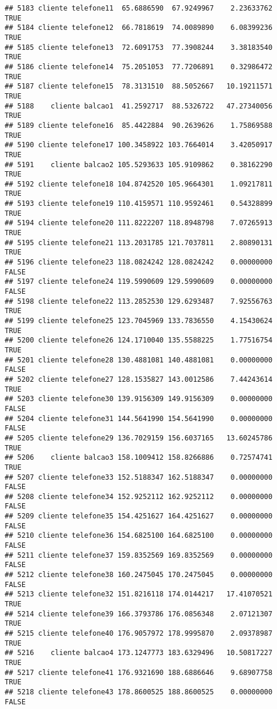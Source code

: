 \documentclass[
]{article}
\begin{document}
\begin{verbatim}
## 5183 cliente telefone11  65.6886590  67.9249967    2.23633762     TRUE
## 5184 cliente telefone12  66.7818619  74.0089890    6.08399236     TRUE
## 5185 cliente telefone13  72.6091753  77.3908244    3.38183540     TRUE
## 5186 cliente telefone14  75.2051053  77.7206891    0.32986472     TRUE
## 5187 cliente telefone15  78.3131510  88.5052667   10.19211571     TRUE
## 5188    cliente balcao1  41.2592717  88.5326722   47.27340056     TRUE
## 5189 cliente telefone16  85.4422884  90.2639626    1.75869588     TRUE
## 5190 cliente telefone17 100.3458922 103.7664014    3.42050917     TRUE
## 5191    cliente balcao2 105.5293633 105.9109862    0.38162290     TRUE
## 5192 cliente telefone18 104.8742520 105.9664301    1.09217811     TRUE
## 5193 cliente telefone19 110.4159571 110.9592461    0.54328899     TRUE
## 5194 cliente telefone20 111.8222207 118.8948798    7.07265913     TRUE
## 5195 cliente telefone21 113.2031785 121.7037811    2.80890131     TRUE
## 5196 cliente telefone23 118.0824242 128.0824242    0.00000000    FALSE
## 5197 cliente telefone24 119.5990609 129.5990609    0.00000000    FALSE
## 5198 cliente telefone22 113.2852530 129.6293487    7.92556763     TRUE
## 5199 cliente telefone25 123.7045969 133.7836550    4.15430624     TRUE
## 5200 cliente telefone26 124.1710040 135.5588225    1.77516754     TRUE
## 5201 cliente telefone28 130.4881081 140.4881081    0.00000000    FALSE
## 5202 cliente telefone27 128.1535827 143.0012586    7.44243614     TRUE
## 5203 cliente telefone30 139.9156309 149.9156309    0.00000000    FALSE
## 5204 cliente telefone31 144.5641990 154.5641990    0.00000000    FALSE
## 5205 cliente telefone29 136.7029159 156.6037165   13.60245786     TRUE
## 5206    cliente balcao3 158.1009412 158.8266886    0.72574741     TRUE
## 5207 cliente telefone33 152.5188347 162.5188347    0.00000000    FALSE
## 5208 cliente telefone34 152.9252112 162.9252112    0.00000000    FALSE
## 5209 cliente telefone35 154.4251627 164.4251627    0.00000000    FALSE
## 5210 cliente telefone36 154.6825100 164.6825100    0.00000000    FALSE
## 5211 cliente telefone37 159.8352569 169.8352569    0.00000000    FALSE
## 5212 cliente telefone38 160.2475045 170.2475045    0.00000000    FALSE
## 5213 cliente telefone32 151.8216118 174.0144217   17.41070521     TRUE
## 5214 cliente telefone39 166.3793786 176.0856348    2.07121307     TRUE
## 5215 cliente telefone40 176.9057972 178.9995870    2.09378987     TRUE
## 5216    cliente balcao4 173.1247773 183.6329496   10.50817227     TRUE
## 5217 cliente telefone41 176.9321690 188.6886646    9.68907758     TRUE
## 5218 cliente telefone43 178.8600525 188.8600525    0.00000000    FALSE

\end{verbatim}
\end{document}
